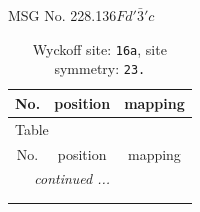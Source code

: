 \documentclass[fleqn,8pt]{jsarticle}
\begin{document}
\setcounter{MaxMatrixCols}{32}

\renewcommand{\tablename}{Table~}
\renewcommand{\figurename}{Figure~}
\begin{center}
\LARGE
MSG No. 228.136\quad$Fd'\bar{3}'c$
\end{center}
\renewcommand{\arraystretch}{1.2}
\begin{longtable}{ccc}
\caption{Wyckoff site: {\tt 16a}, site symmetry: {\tt 23.}}
 \\
 \hline \hline
No. & position & mapping \\ \hline \endfirsthead

\multicolumn{2}{l}{\tablename\ \thetable{}} \\
 \hline \hline
No. & position & mapping \\ \hline \endhead

 \hline \hline
\multicolumn{2}{r}{\footnotesize\it continued ...} \\ \endfoot

 \hline \hline
\multicolumn{2}{r}{} \\ \endlastfoot


\end{longtable}
\end{document}
